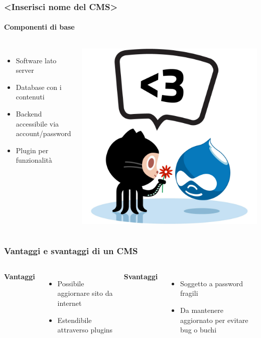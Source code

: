 \begin{frame}
	\frametitle{<Inserisci nome del CMS>}
	\framesubtitle{Componenti di base}
	\begin{columns}
		\begin{itemize}
			\item Software lato server
			\item Database con i contenuti
			\item Backend accessibile via account/password
			\item Plugin per funzionalità
		\end{itemize}
		\includegraphics[scale=0.17]{img/octocats/drupalcat.jpg}
	\end{columns}
\end{frame}

\begin{frame}
	\frametitle{Vantaggi e svantaggi di un CMS}
	\begin{columns}
		\column{0.5\textwidth}
		\begin{center}
			\textbf{Vantaggi}
		\end{center}
		\begin{itemize}
			\item Possibile aggiornare sito da internet
			\item Estendibile attraverso plugins
		\end{itemize}

		\column{0.5\textwidth}
		\begin{center}
			\textbf{Svantaggi}
		\end{center}
		\begin{itemize}
			\item Soggetto a password fragili
			\item Da mantenere aggiornato per evitare bug o buchi
		\end{itemize}

	\end{columns}
\end{frame}

